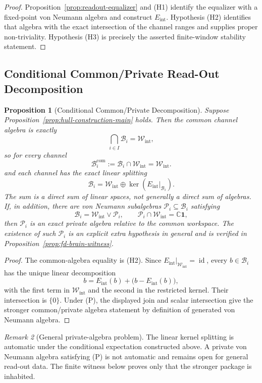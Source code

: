 \documentclass[12pt]{article}
\newtheorem{proposition}{Proposition}[section]
\theoremstyle{definition}
\theoremstyle{remark}
\newtheorem{remark}[proposition]{Remark}
\newcommand{\Wint}{\mathcal W_{\mathrm{int}}}
\begin{document}
\begin{proof}
Proposition~\ref{prop:readout-equalizer} and (H1) identify the equalizer
with a fixed-point von Neumann algebra and construct
\(E_{\mathrm{int}}\). Hypothesis (H2) identifies that algebra with the
exact intersection of the channel ranges and supplies proper
non-triviality. Hypothesis (H3) is precisely the asserted finite-window
stability statement.
\end{proof}

\subsection{Conditional Common/Private Read-Out Decomposition}

\begin{proposition}[Conditional Common/Private Decomposition]
\label{prop:common-private-main}
Suppose Proposition~\ref{prop:hull-construction-main} holds. Then the
common channel algebra is exactly
\[
\bigcap_{i\in I}\mathcal B_i=\Wint,
\]
so for every channel
\[
\mathcal B_i^{\mathrm{com}}
:=\mathcal B_i\cap\Wint
=\Wint.
\]
and each channel has the exact linear splitting
\[
\mathcal B_i
=
\Wint\oplus
\ker(E_{\mathrm{int}}|_{\mathcal B_i}).
\]
The sum is a direct sum of linear spaces, not generally a direct sum of
algebras. If, in addition, there are von Neumann subalgebras
\(\mathcal P_i\subseteq\mathcal B_i\) satisfying
\[
\mathcal B_i=\Wint\vee\mathcal P_i,
\qquad
\mathcal P_i\cap\Wint=\mathbb C\mathbf1,
\tag{P}
\]
then \(\mathcal P_i\) is an exact private algebra relative to the common
workspace. The existence of such \(\mathcal P_i\) is an explicit extra
hypothesis in general and is verified in
Proposition~\ref{prop:fd-brain-witness}.
\end{proposition}

\begin{proof}
The common-algebra equality is (H2). Since
\(E_{\mathrm{int}}|_{\Wint}=\operatorname{id}\), every
\(b\in\mathcal B_i\) has the unique linear decomposition
\[
b=E_{\mathrm{int}}(b)+\bigl(b-E_{\mathrm{int}}(b)\bigr),
\]
with the first term in \(\Wint\) and the second in the restricted
kernel. Their intersection is \(\{0\}\). Under (P), the displayed join
and scalar intersection give the stronger common/private algebra
statement by definition of generated von Neumann algebra.
\end{proof}

\begin{remark}[General private-algebra problem]
The linear kernel splitting is automatic under the conditional
expectation constructed above. A private von Neumann algebra satisfying
(P) is not automatic and remains open for general read-out data. The
finite witness below proves only that the stronger package is inhabited.
\end{remark}
\end{document}
